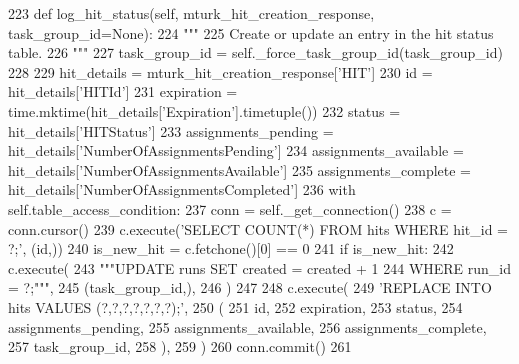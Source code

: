 \begin{DoxyCode}
223     \textcolor{keyword}{def }log\_hit\_status(self, mturk\_hit\_creation\_response, task\_group\_id=None):
224         \textcolor{stringliteral}{"""}
225 \textcolor{stringliteral}{        Create or update an entry in the hit status table.}
226 \textcolor{stringliteral}{        """}
227         task\_group\_id = self.\_force\_task\_group\_id(task\_group\_id)
228 
229         hit\_details = mturk\_hit\_creation\_response[\textcolor{stringliteral}{'HIT'}]
230         id = hit\_details[\textcolor{stringliteral}{'HITId'}]
231         expiration = time.mktime(hit\_details[\textcolor{stringliteral}{'Expiration'}].timetuple())
232         status = hit\_details[\textcolor{stringliteral}{'HITStatus'}]
233         assignments\_pending = hit\_details[\textcolor{stringliteral}{'NumberOfAssignmentsPending'}]
234         assignments\_available = hit\_details[\textcolor{stringliteral}{'NumberOfAssignmentsAvailable'}]
235         assignments\_complete = hit\_details[\textcolor{stringliteral}{'NumberOfAssignmentsCompleted'}]
236         with self.table\_access\_condition:
237             conn = self.\_get\_connection()
238             c = conn.cursor()
239             c.execute(\textcolor{stringliteral}{'SELECT COUNT(*) FROM hits WHERE hit\_id = ?;'}, (id,))
240             is\_new\_hit = c.fetchone()[0] == 0
241             \textcolor{keywordflow}{if} is\_new\_hit:
242                 c.execute(
243                     \textcolor{stringliteral}{"""UPDATE runs SET created = created + 1}
244 \textcolor{stringliteral}{                             WHERE run\_id = ?;"""},
245                     (task\_group\_id,),
246                 )
247 
248             c.execute(
249                 \textcolor{stringliteral}{'REPLACE INTO hits VALUES (?,?,?,?,?,?,?);'},
250                 (
251                     id,
252                     expiration,
253                     status,
254                     assignments\_pending,
255                     assignments\_available,
256                     assignments\_complete,
257                     task\_group\_id,
258                 ),
259             )
260             conn.commit()
261 
\end{DoxyCode}
\mbox{\label{classparlai_1_1mturk_1_1core_1_1dev_1_1mturk__data__handler_1_1MTurkDataHandler_ae8c02400cd4261b79571e6108955c883}} 

